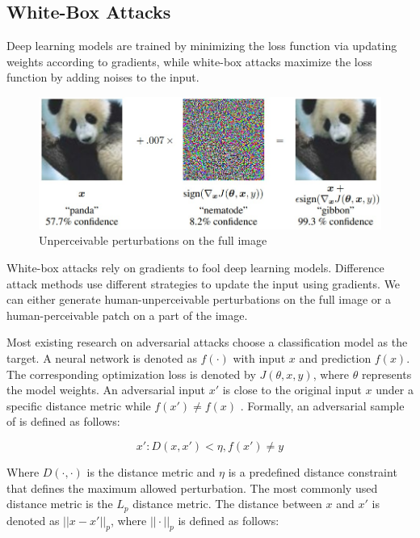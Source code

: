 \subsection{White-Box Attacks}
\label{sec:whitebox_attack}

Deep learning models are trained by minimizing the loss function via updating weights according to gradients, while white-box attacks maximize the loss function by adding noises to the input.

\begin{figure}[H]
\centering
\includegraphics[scale=0.5]{figures/chapter_intro/fgsm.jpg}
\caption{Unperceivable perturbations on the full image}
\label{fig.adv_perturb}
\end{figure}

White-box attacks rely on gradients to fool deep learning models. Difference attack methods use different strategies to update the input using gradients. We can either generate human-unperceivable perturbations on the full image or a human-perceivable patch on a part of the image.

Most existing research on adversarial attacks choose a classification model as the target. A neural network is denoted as $f(\cdot)$ with input $x$ and prediction $f(x)$. The corresponding optimization loss is denoted by $J(\theta, x, y)$, where $\theta$ represents the model weights. An adversarial input $x'$ is close to the original input $x$ under a specific distance metric while $f(x') \neq f(x)$ \citep{REN2020346}. Formally, an adversarial sample of  is defined as follows:

$$x': D(x, x') < \eta, f(x') \neq y $$

Where $D(\cdot, \cdot)$ is the distance metric and $ \eta $ is a predefined distance constraint that defines the maximum allowed perturbation. The most commonly used distance metric is the $L_p$ distance metric. The distance between $x$ and $x'$ is denoted as $||x-x'||_{p}$, where $||\cdot||_p$ is defined as follows:

